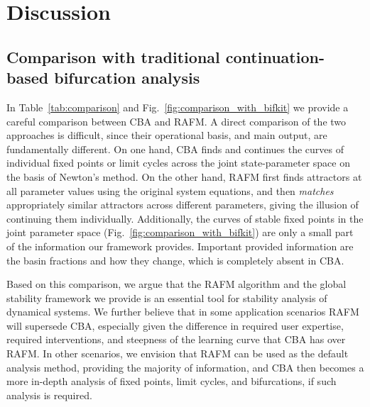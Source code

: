 \documentclass[9pt,twocolumn,twoside,lineno]{pnas-new}
\begin{document}
\section{Discussion}
\label{sec:discussion}

\subsection{Comparison with traditional continuation-based bifurcation analysis}
\label{sec:compare_linear}
In Table~\ref{tab:comparison} and Fig.~\ref{fig:comparison_with_bifkit} we provide a careful comparison between CBA and RAFM. A direct comparison of the two approaches is difficult, since their operational basis, and main output, are fundamentally different. On one hand, CBA finds and continues the curves of individual fixed points or limit cycles across the joint state-parameter space on the basis of Newton's method. On the other hand, RAFM first finds attractors at all parameter values using the original system equations, and then \emph{matches} appropriately similar attractors across different parameters, giving the illusion of continuing them individually. Additionally, the curves of stable fixed points in the joint parameter space (Fig.~\ref{fig:comparison_with_bifkit}) are only a small part of the information our framework provides. Important provided information are the basin fractions and how they change, which is completely absent in CBA. 

Based on this comparison, we argue that the RAFM algorithm and the global stability framework we provide is an essential tool for stability analysis of dynamical systems. We further believe that in some application scenarios RAFM will supersede CBA, especially given the difference in required user expertise, required interventions, and steepness of the learning curve that CBA has over RAFM. In other scenarios, we envision that RAFM can be used as the default analysis method, providing the majority of information, and CBA then becomes a more in-depth analysis of fixed points, limit cycles, and bifurcations, if such analysis is required.

\end{document}
